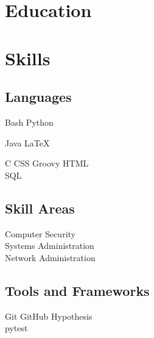 \documentclass[]{deedy-resume-openfont}
\begin{document}
%
%

%
%

\begin{minipage}[t]{0.35\textwidth}


\section{Education} 
\sectionsep


\section{Skills}

\subsection{Languages}

Bash \textbullet{} Python

Java \textbullet{} \LaTeX\

C \textbullet{} CSS \textbullet{} Groovy \textbullet{} HTML \\
SQL
\sectionsep

\subsection{Skill Areas}

Computer Security \\
Systems Administration \\
Network Administration
\sectionsep

\subsection{Tools and Frameworks}
Git \textbullet{} GitHub \textbullet{} Hypothesis \\
pytest


\end{minipage}
\end{document}

